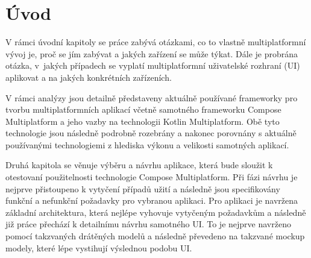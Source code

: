\chapter{Úvod}
\setcounter{page}{1}



V rámci úvodní kapitoly se práce zabývá otázkami, co to vlastně multiplatformní vývoj je, proč se jím zabývat a jakých zařízení se může týkat.
Dále je probrána otázka, v~jakých případech se vyplatí multiplatformní uživatelské rozhraní (UI) aplikovat a na jakých konkrétních zařízeních. 





V rámci analýzy jsou detailně představeny aktuálně používané frameworky pro tvorbu multiplatformních aplikací včetně samotného
frameworku Compose Multiplatform a jeho vazby na technologii Kotlin Multiplatform. Obě tyto technologie jsou následně podrobně rozebrány
a nakonec porovnány s aktuálně používanými technologiemi z hlediska výkonu a velikosti samotných aplikací.

\medskip

Druhá kapitola se věnuje výběru a návrhu aplikace, která bude sloužit k otestovaní použitelnosti technologie Compose Multiplatform.
Při fázi návrhu je nejprve přistoupeno k vytyčení případů užití a následně jsou specifikovány funkční a nefunkční požadavky pro vybranou aplikaci.
Pro aplikaci je navržena základní architektura, která nejlépe vyhovuje vytyčeným požadavkům a následně již práce přechází k detailnímu
návrhu samotného UI. To je nejprve navrženo pomocí takzvaných drátěných modelů a následně převedeno na takzvané mockup modely, které
lépe vystihují výslednou podobu UI.

